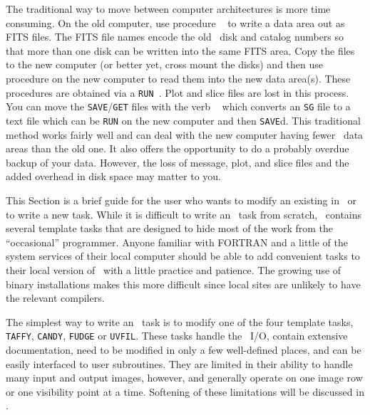 The traditional way to move between computer architectures is more
time consuming.  On the old computer, use procedure {\tt
{}} to write a data area out as FITS files.  The FITS file
names encode the old \AIPS\ disk and catalog numbers so that more than
one disk can be written into the same FITS area.  Copy the files to
the new computer (or better yet, cross mount the disks) and then use
procedure {\tt {}} on the new computer to read them into
the new data area(s).  These procedures are obtained via a {\tt RUN
}\@.  Plot and slice files are lost in this process.
You can move the {\tt SAVE}/{\tt GET} files with the verb {\tt
{}} which converts an {\tt SG} file to a text file which
can be {\tt RUN} on the new computer and then {\tt SAVE}d.  This
traditional method works fairly well and can deal with the new
computer having fewer \AIPS\ data areas than the old one.  It also
offers the opportunity to do a probably overdue backup of your data.
However, the loss of message, plot, and slice files and the added
overhead in disk space may matter to you.


     This Section is a brief guide for the user who wants to modify an
existing  in \AIPS\ or to write a new task.  While it is
difficult to write an \AIPS\ task from scratch, \AIPS\ contains
several template tasks that are designed to hide most of the work from
the ``occasional'' programmer.  Anyone familiar with FORTRAN and a
little of the system services of their local computer should be able
to add convenient tasks to their local version of \AIPS\ with a little
practice and patience.  The growing use of binary installations makes
this more difficult since local sites are unlikely to have the
relevant compilers.


     The simplest way to write an \AIPS\ task is to modify one of the
four template tasks, {\tt TAFFY}, {\tt CANDY}, {\tt FUDGE} or
\hbox{{\tt UVFIL}}.  These tasks handle the \AIPS\ I/O, contain
extensive documentation, need to be modified in only a few
well-defined places, and can be easily interfaced to user subroutines.
They are limited in their ability to handle many input and output
images, however, and generally operate on one image row or one
visibility point at a time.  Softening of these limitations will be
discussed in .

